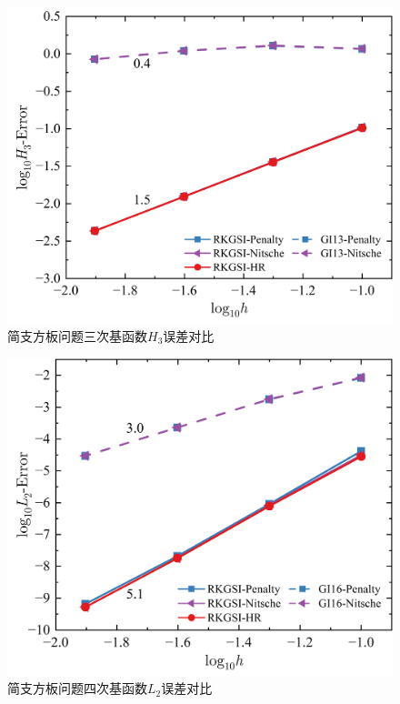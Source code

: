 \begin{figure}[H]
    \centering
    \includegraphics[scale=0.5]{figure/PHR/R/CH3.png}
    \caption{简支方板问题三次基函数$H_3$误差对比}
\end{figure}
\begin{figure}[H]
    \centering
    \includegraphics[scale=0.5]{figure/PHR/R/QL2.png}
    \caption{简支方板问题四次基函数$L_2$误差对比}
\end{figure}
\newpage
